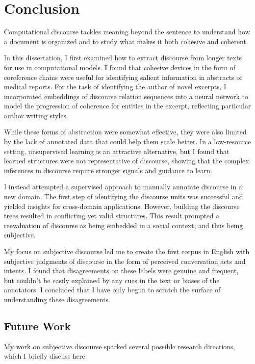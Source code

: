 \chapter{Conclusion}
\label{ch:conclusion}

Computational discourse tackles meaning beyond the sentence to understand how a document is organized and to study what makes it both cohesive and coherent. 

In this dissertation, I first examined how to extract discourse from longer texts for use in computational models. I found that cohesive devices in the form of coreference chains were useful for identifying salient information in abstracts of medical reports. For the task of identifying the author of novel excerpts, I incorporated embeddings of discourse relation sequences into a neural network to model the progression of coherence for entities in the excerpt, reflecting particular author writing styles.

While these forms of abstraction were somewhat effective, they were also limited by the lack of annotated data that could help them scale better. In a low-resource setting, unsupervised learning is an attractive alternative, but I found that learned structures were not representative of discourse, showing that the complex inferences in discourse require stronger signals and guidance to learn. 

I instead attempted a supervised approach to manually annotate discourse in a new domain. The first step of identifying the discourse units was successful and yielded insights for cross-domain applications. However, building the discourse trees resulted in conflicting yet valid structures. This result prompted a reevaluation of discourse as being embedded in a social context, and thus being subjective.

My focus on subjective discourse led me to create the first corpus in English with subjective judgments of discourse in the form of perceived conversation acts and intents. I found that disagreements on these labels were genuine and frequent, but couldn't be easily explained by any cues in the text or biases of the annotators. I concluded that I have only begun to scratch the surface of understanding these disagreements.

\section{Future Work}
My work on subjective discourse sparked several possible research directions, which I briefly discuss here. 

